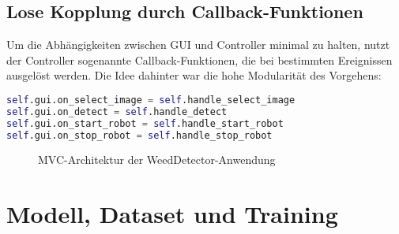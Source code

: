 \documentclass[12pt, a4paper]{scrreprt}
\begin{document}
\section{Lose Kopplung durch Callback-Funktionen}

Um die Abhängigkeiten zwischen GUI und Controller minimal zu halten, nutzt der Controller sogenannte Callback-Funktionen, die bei bestimmten Ereignissen ausgelöst werden. Die Idee dahinter war die hohe Modularität des Vorgehens:

\begin{lstlisting}[language=Python, caption=Callback-Registrierung im Controller]
self.gui.on_select_image = self.handle_select_image
self.gui.on_detect = self.handle_detect
self.gui.on_start_robot = self.handle_start_robot
self.gui.on_stop_robot = self.handle_stop_robot
\end{lstlisting}

\begin{figure}[h!]
    \centering
    \caption{MVC-Architektur der WeedDetector-Anwendung}
    \label{fig:mvc-diagramm}
\end{figure}


\chapter{Modell, Dataset und Training}
\end{document}
